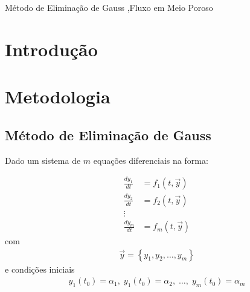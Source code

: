 \documentclass[final,5p]{elsarticle}
\numberwithin{equation}{section}
\begin{document}
\begin{frontmatter}

\begin{keyword}
    Método de Eliminação de Gauss \sep Fluxo em Meio Poroso



\end{keyword}

\end{frontmatter}


\section{Introdução}



\section{Metodologia}

    \subsection{Método de Eliminação de Gauss}


    Dado um sistema de $m$ equações diferenciais na forma:

    \begin{align}
        \frac{dy_1}{dt} &= f_1(t, \overrightarrow{y}) \nonumber \\
        \frac{dy_2}{dt} &= f_2(t, \overrightarrow{y}) \nonumber \\
        \vdots \nonumber \\
        \frac{dy_m}{dt} &= f_m(t, \overrightarrow{y}) \label{eq:pvi}
    \end{align}
    \noindent com
    \begin{align}
        \overrightarrow{y} = \left\{ y_1, y_2, \ldots, y_m \right\} \nonumber
    \end{align}
    \noindent e condições iniciais
    \begin{align}
        y_1(t_0) = \alpha_1, \; y_1(t_0) = \alpha_2, \; \ldots, \; y_m(t_0) = \alpha_m \nonumber
    \end{align}
\end{document}
